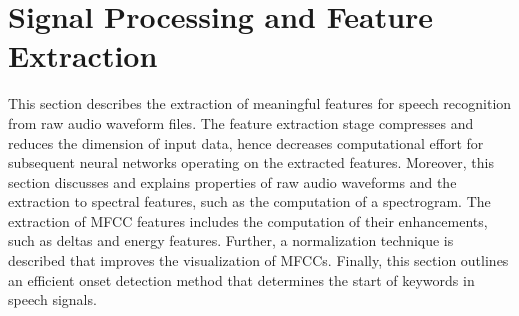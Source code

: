 
\chapter{Signal Processing and Feature Extraction}\label{sec:signal}
This section describes the extraction of meaningful features for speech recognition from raw audio waveform files.
The feature extraction stage compresses and reduces the dimension of input data, hence decreases computational effort for subsequent neural networks operating on the extracted features.
Moreover, this section discusses and explains properties of raw audio waveforms and the extraction to spectral features, such as the computation of a spectrogram. 
The extraction of MFCC features includes the computation of their enhancements, such as deltas and energy features.
Further, a normalization technique is described that improves the visualization of MFCCs.
Finally, this section outlines an efficient onset detection method that determines the start of keywords in speech signals.





